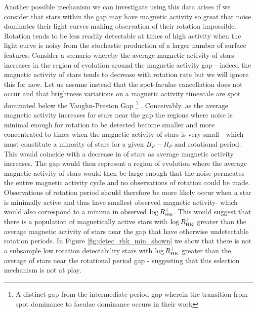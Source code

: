 Another possible mechanism we can investigate using this data arises if we consider that stars within the gap may have magnetic activity so great that noise dominates their light curves making observation of their rotation impossible.
Rotation tends to be less readily detectable at times of high activity when the light curve is noisy from the stochastic production of a larger number of surface features.
Consider a scenario whereby the average magnetic activity of stars increases in the region of evolution around the magnetic activity gap - indeed the magnetic activity of stars tends to decrease with rotation rate but we will ignore this for now.
Let us assume instead that the spot-faculae cancellation does not occur and that brightness variations on a magnetic activity timescale are spot dominated below the Vaughn-Preston Gap \footnote{A distinct gap from the intermediate period gap wherein the transition from spot dominance to faculae dominance occurs in their work} .
Conceivably, as the average magnetic activity increases for stars near the gap the regions where noise is minimal enough for rotation to be detected become smaller and more concentrated to times when the magnetic activity of stars is very small - which must constitute a minority of stars for a given $B_P-R_P$ and rotational period.
This would coincide with a decrease in \rper{} of stars as average magnetic activity increases.
The gap would then represent a region of evolution where the average magnetic activity of stars would then be large enough that the noise permeates the entire magnetic activity cycle and no observations of rotation could be made.
Observations of rotation period should therefore be more likely occur when a star is minimally active and thus have smallest observed magnetic activity- which would also correspond to a minima in observed $\log R^{+}_{\rm{HK}}$.
This would suggest that there is a population of magnetically active stars with $\log R^{+}_{\rm{HK}}$ greater than the average magnetic activity of stars near the gap that have otherwise undetectable rotation periods.
In Figure \ref{fig:detec_rhk_min_shown} we show that there is not a subsample low rotation detectability stars with $\log R^{+}_{\rm{HK}}$ greater than the average of stars near the rotational period gap - suggesting that this selection mechanism is not at play.

